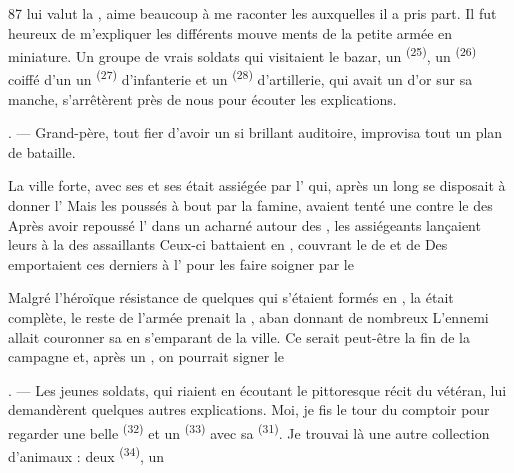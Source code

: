 \begin{VUpage}[89]{87}
\VUcontinue
lui valut la , aime beaucoup à me\nl
raconter les  auxquelles il a pris part.\nl
Il fut heureux de m'expliquer les différents mouve\cc
ments de la petite armée en miniature. Un groupe de\nl
vrais soldats qui visitaient le bazar, un \nl
{}\textsuperscript{(25)}, un \textsuperscript{(26)} coiffé d'un \nl
un \textsuperscript{(27)} d'infanterie et un \nl
{}\textsuperscript{(28)} d'artillerie, qui avait un  d'or sur\nl
sa manche, s'arrêtèrent près de nous pour écouter les\nl
explications.

. --- Grand-père, tout fier d'avoir un si brillant\nl
auditoire, improvisa tout un plan de bataille.

\VUblancAlinea
La ville forte, avec ses  et ses \nl
était assiégée par l' qui, après un\nl
long  se disposait à donner l'\nl
Mais les  poussés à bout par la famine,\nl
avaient tenté une  contre le  des \cc
{} Après avoir repoussé l' dans un\nl
{} acharné autour des , les assiégeants\nl
{} lançaient leurs  à la \cc
{} des assaillants  Ceux-ci battaient en\nl
{}, couvrant le  de \nl
et de  Des  emportaient ces\nl
derniers à l' pour les faire soigner par\nl
le 

\VUblancAlinea
Malgré l'héroïque résistance de quelques \cc
{} qui s'étaient formés en , la  était\nl
complète, le reste de l'armée prenait la , aban\cc
donnant de nombreux  L'ennemi allait\nl
couronner sa  en s'emparant de la ville. Ce\nl
serait peut-être la fin de la campagne et, après un\nl
{}, on pourrait signer le 

. --- Les jeunes soldats, qui riaient en écoutant le\nl
pittoresque récit du vétéran, lui demandèrent quelques\nl
autres explications. Moi, je fis le tour du comptoir\nl
pour regarder une belle \textsuperscript{(32)} et un \textsuperscript{(33)}\nl
avec sa \textsuperscript{(31)}. Je trouvai là une autre collection\nl
d'animaux : deux \textsuperscript{(34)}, un \cc
\parplein
\end{VUpage}

